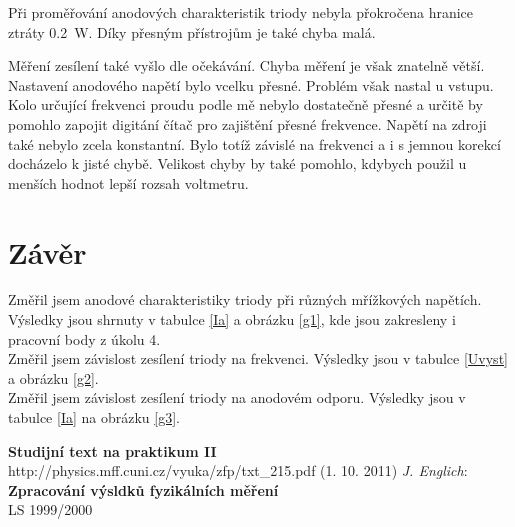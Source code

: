 \documentclass[a4paper,12pt]{article}
\begin{document}
Při proměřování anodových charakteristik triody nebyla přokročena hranice ztráty 0.2~W. Díky přesným přístrojům 
je také chyba malá.

Měření zesílení také vyšlo dle očekávání. Chyba měření je však znatelně větší. Nastavení anodového napětí 
bylo vcelku přesné. Problém však nastal u vstupu. Kolo určující frekvenci proudu podle mě nebylo dostatečně 
přesné a určitě by pomohlo zapojit digitání čítač pro zajištění přesné frekvence. Napětí na zdroji také 
nebylo zcela konstantní. Bylo totíž závislé na frekvenci a i s jemnou korekcí docházelo k jisté chybě. 
Velikost chyby by také pomohlo, kdybych použil u menších hodnot lepší rozsah voltmetru.


\section{Závěr}
\noindent
Změřil jsem anodové charakteristiky triody při různých mřížkových napětích. Výsledky jsou shrnuty v tabulce \ref{Ia} a obrázku \ref{g1},
 kde jsou zakresleny i pracovní body z úkolu 4.\\
Změřil jsem závislost zesílení triody na frekvenci. Výsledky jsou v tabulce \ref{Uvyst} a obrázku \ref{g2}. \\
Změřil jsem závislost zesílení triody na anodovém odporu. Výsledky jsou v tabulce \ref{Ia} na obrázku \ref{g3}.


\eject

\begin{thebibliography}{5}
	 \textbf{Studijní text na praktikum II} \\http://physics.mff.cuni.cz/vyuka/zfp/txt\_215.pdf (1. 10. 2011)
     \emph{J. Englich}: \textbf{Zpracování výsldků fyzikálních měření} \\ LS 1999/2000
\end{thebibliography}
\end{document}
